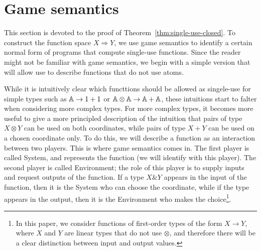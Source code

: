 \newcommand{\invar}[1]{#1_{\mathrm{in}}}
\newcommand{\outvar}[1]{#1_{\mathrm{out}}}

\section{Game semantics}
\label{sec:game-semantics}

This section is devoted to the proof of Theorem~\ref{thm:single-use-closed}. To construct the function space $X \Rightarrow Y$, we use game semantics to identify a certain normal form of programs that compute single-use functions. Since the reader might not be familiar with game semantics, we begin with a simple version that will allow use to describe functions that do not use atoms. 

While it is intuitively clear which functtions should be allowed as singele-use for simple types such as $\mathbb A \to 1+1$ or $\mathbb A \otimes \mathbb A \to \mathbb A + \mathbb A$, these intuitions start to falter when considering more complex types. For more complex types, it becomes more useful to give a more principled description of the intuition that pairs of type $X \otimes Y$ can be used on both coordinates, while pairs of type $X + Y$ can be used on a chosen coordinate only. To do this, we will describe a function as an interaction between two players.  This is where game semantics comes in. The first player is called System, and represents the function (we will identify with this player). The second player is called Environment; the role of this player is to supply inputs  and request outputs of the function. If a type $X \& Y$ appears in the input of the function, then it is the System who can choose the coordinate, while if the type appears in the output, then it is the Environment who makes the choice\footnote{In this paper, we consider functions of first-order types of the form $X \to Y$, where $X$ and $Y$ are linear types that do not use $\otimes$, and therefore there will be a clear distinction between input and output values.}.

